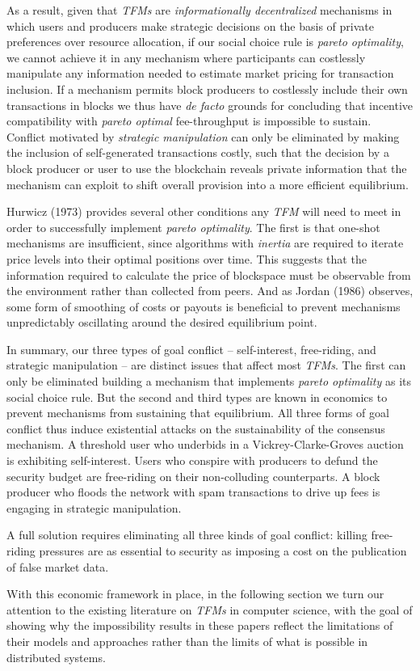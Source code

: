 As a result, given that \textit{TFMs} are \textit{informationally decentralized} mechanisms in which users and producers make strategic decisions on the basis of private preferences over resource allocation, if our social choice rule is \textit{pareto optimality}, we cannot achieve it in any mechanism where participants can costlessly manipulate any information needed to estimate market pricing for transaction inclusion. If a mechanism permits block producers to costlessly include their own transactions in blocks we thus have \textit{de facto} grounds for concluding that incentive compatibility with \textit{pareto optimal} fee-throughput is impossible to sustain. Conflict motivated by \textit{strategic manipulation} can only be eliminated by making the inclusion of self-generated transactions costly, such that the decision by a block producer or user to use the blockchain reveals private information that the mechanism can exploit to shift overall provision into a more efficient equilibrium.

Hurwicz (1973) provides several other conditions any \textit{TFM} will need to meet in order to successfully implement \textit{pareto optimality}. The first is that one-shot mechanisms are insufficient, since algorithms with \textit{inertia} are required to iterate price levels into their optimal positions over time. This suggests that the information required to calculate the price of blockspace must be observable from the environment rather than collected from peers. And as Jordan (1986) observes, some form of smoothing of costs or payouts is beneficial to prevent mechanisms unpredictably oscillating around the desired equilibrium point.

In summary, our three types of goal conflict -- self-interest, free-riding, and strategic manipulation -- are distinct issues that affect most \textit{TFMs}. The first can only be eliminated building a mechanism that implements \textit{pareto optimality} as its social choice rule. But the second and third types are known in economics to prevent mechanisms from sustaining that equilibrium. All three forms of goal conflict thus induce existential attacks on the sustainability of the consensus mechanism. A threshold user who underbids in a Vickrey-Clarke-Groves auction is exhibiting self-interest. Users who conspire with producers to defund the security budget are free-riding on their non-colluding counterparts. A block producer who floods the network with spam transactions to drive up fees is engaging in strategic manipulation. 

A full solution requires eliminating all three kinds of goal conflict: killing free-riding pressures are as essential to security as imposing a cost on the publication of false market data.

With this economic framework in place, in the following section we turn our attention to the existing literature on \textit{TFMs} in computer science, with the goal of showing why the impossibility results in these papers reflect the limitations of their models and approaches rather than the limits of what is possible in distributed systems.

